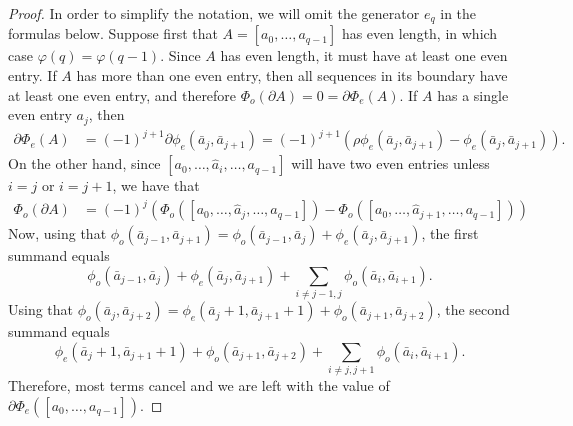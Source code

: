 \begin{proof} In order to simplify the notation, we will omit the generator $e_q$ in the formulas below.
	Suppose first that $A = [a_0,\dots,a_{q-1}]$ has even length, in which case $\varphi(q) = \varphi(q-1)$. Since $A$ has even length, it must have at least one even entry. If $A$ has more than one even entry, then all sequences in its boundary have at least one even entry, and therefore $\Phi_o(\partial A) = 0 = \partial\Phi_e(A)$. If $A$ has a single even entry $a_j$, then
	\begin{align*}
		\partial \Phi_e(A) &= (-1)^{j+1}\partial \phi_e(\bar a_j,\bar a_{j+1}) = (-1)^{j+1}\left(\rho\phi_e(\bar a_j,\bar a_{j+1}
		) - \phi_e(\bar a_j,\bar a_{j+1})\right).
	\end{align*}
	On the other hand, since $[a_0,\dots,\hat{a}_i,\dots,a_{q-1}]$ will have two even entries unless $i=j$ or $i=j+1$, we have that
	\begin{align*}
		\Phi_o(\partial A)
		&= (-1)^{j}\left(\Phi_o ([a_0,\dots,\hat{a}_j,\dots,a_{q-1}])-\Phi_o ([a_0,\dots,\hat{a}_{j+1},\dots,a_{q-1}])\right)
	\end{align*}
	Now, using that $\phi_o(\bar a_{j-1},\bar a_{j+1}) = \phi_o(\bar a_{j-1},\bar a_j) + \phi_e(\bar a_j,\bar a_{j+1})$, the first summand equals
	\[
	\phi_o(\bar a_{j-1},\bar a_j) + \phi_e(\bar a_j,\bar a_{j+1})+\sum_{i\neq j-1,j} \phi_o(\bar a_i,\bar a_{i+1}).
	\]
	Using that $\phi_o(\bar a_{j},\bar a_{j+2}) = \phi_e(\bar a_j+1,\bar a_{j+1}+1)+\phi_o(\bar a_{j+1},\bar a_{j+2})$, the second summand equals
	\[
	\phi_e(\bar a_j+1,\bar a_{j+1}+1) + \phi_o(\bar a_{j+1},\bar a_{j+2})+\sum_{i\neq j,j+1} \phi_o(\bar a_i,\bar a_{i+1}).
	\]
	Therefore, most terms cancel and we are left with the value of $\partial \Phi_e([a_0,\dots,a_{q-1}])$.


\end{proof}
